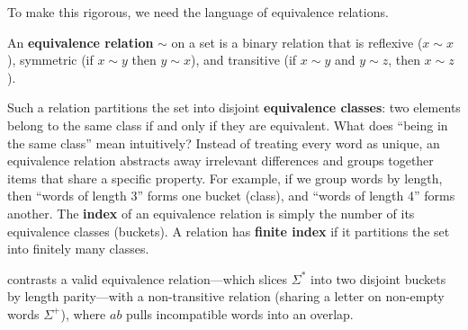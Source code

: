 To make this rigorous, we need the language of equivalence relations.

\begin{definition}
An \textbf{equivalence relation} $\sim$ on a set is a binary relation that is reflexive ($x \sim x$), symmetric (if $x \sim y$ then $y \sim x$), and transitive (if $x \sim y$ and $y \sim z$, then $x \sim z$).

Such a relation partitions the set into disjoint \textbf{equivalence classes}: two elements belong to the same class if and only if they are equivalent. 
What does ``being in the same class'' mean intuitively? Instead of treating every word as unique, an equivalence relation abstracts away irrelevant differences and groups together items that share a specific property. For example, if we group words by length, then ``words of length 3'' forms one bucket (class), and ``words of length 4'' forms another. 
The \textbf{index} of an equivalence relation is simply the number of its equivalence classes (buckets). A relation has \textbf{finite index} if it partitions the set into finitely many classes.
\end{definition}

 contrasts a valid equivalence relation---which slices $\Sigma^*$ into two disjoint buckets by length parity---with a non-transitive relation (sharing a letter on non-empty words $\Sigma^+$), where $ab$ pulls incompatible words into an overlap.


